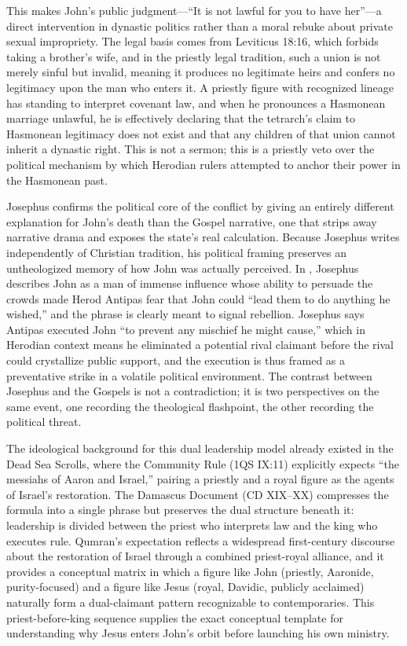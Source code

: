 This makes John's public judgment---``It is not lawful for you to have her''---a direct intervention in dynastic politics rather than a moral rebuke about private sexual impropriety.
The legal basis comes from Leviticus 18:16, which forbids taking a brother's wife, and in the priestly legal tradition, such a union is not merely sinful but invalid, meaning it produces no legitimate heirs and confers no legitimacy upon the man who enters it.
A priestly figure with recognized lineage has standing to interpret covenant law, and when he pronounces a Hasmonean marriage unlawful, he is effectively declaring that the tetrarch's claim to Hasmonean legitimacy does not exist and that any children of that union cannot inherit a dynastic right.
This is not a sermon; this is a priestly veto over the political mechanism by which Herodian rulers attempted to anchor their power in the Hasmonean past.

Josephus confirms the political core of the conflict by giving an entirely different explanation for John's death than the Gospel narrative, one that strips away narrative drama and exposes the state's real calculation.
Because Josephus writes independently of Christian tradition, his political framing preserves an untheologized memory of how John was actually perceived.
In \cite[18.116--119]{josephus:ant}, Josephus describes John as a man of immense influence whose ability to persuade the crowds made Herod Antipas fear that John could ``lead them to do anything he wished,'' and the phrase is clearly meant to signal rebellion.
Josephus says Antipas executed John ``to prevent any mischief he might cause,'' which in Herodian context means he eliminated a potential rival claimant before the rival could crystallize public support, and the execution is thus framed as a preventative strike in a volatile political environment.
The contrast between Josephus and the Gospels is not a contradiction; it is two perspectives on the same event, one recording the theological flashpoint, the other recording the political threat.

The ideological background for this dual leadership model already existed in the Dead Sea Scrolls, where the Community Rule (1QS IX:11) explicitly expects ``the messiahs of Aaron and Israel,'' pairing a priestly and a royal figure as the agents of Israel's restoration.
The Damascus Document (CD XIX--XX) compresses the formula into a single phrase but preserves the dual structure beneath it: leadership is divided between the priest who interprets law and the king who executes rule.
Qumran's expectation reflects a widespread first-century discourse about the restoration of Israel through a combined priest-royal alliance, and it provides a conceptual matrix in which a figure like John (priestly, Aaronide, purity-focused) and a figure like Jesus (royal, Davidic, publicly acclaimed) naturally form a dual-claimant pattern recognizable to contemporaries.
This priest-before-king sequence supplies the exact conceptual template for understanding why Jesus enters John's orbit before launching his own ministry.

